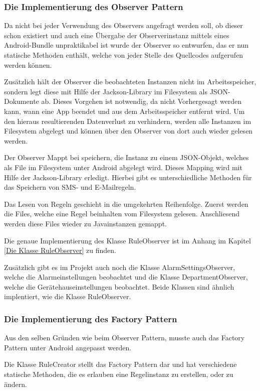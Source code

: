 \subsubsection{Die Implementierung des Observer Pattern}
Da nicht bei jeder Verwendung des Observers angefragt werden soll, ob dieser schon existiert und auch eine \"Ubergabe der Observerinstanz mittels eines Android-Bundle unpraktikabel ist wurde der Observer so entwurfen, das er nun statische Methoden enth\"alt, welche von jeder Stelle des Quellcodes aufgerufen werden k\"onnen.

Zus\"atzlich h\"alt der Observer die beobachteten Instanzen nicht im Arbeitsspeicher, sondern legt diese mit Hilfe der Jackson-Library im Filesystem als JSON-Dokumente ab.
Dieses Vorgehen ist notwendig, da nicht Vorhergesagt werden kann, wann eine App beendet und aus dem Arbeitsspeicher entfernt wird. Um den hieraus resultierenden Datenverlust zu verhindern, werden alle Instanzen im Filesystem abgelegt und k\"onnen \"uber den Observer von dort auch wieder gelesen werden.

Der Observer Mappt bei speichern, die Instanz zu einem JSON-Objekt, welches als File im Filesystem unter Android abgelegt wird. Dieses Mapping wird mit Hilfe der Jackson-Library erledigt. Hierbei gibt es unterschiedliche Methoden f\"ur das Speichern von SMS- und E-Mailregeln.

Das Lesen von Regeln geschieht in die umgekehrten Reihenfolge. Zuerst werden die Files, welche eine Regel beinhalten vom Filesystem gelesen. Anschliesend werden diese Files wieder zu Javainstanzen gemappt.

Die genaue Implementierung des Klasse RuleObserver ist im Anhang im Kapitel \ref{Die Klasse RuleObserver} zu finden.

Zus\"atzlich gibt es im Projekt auch noch die Klasse AlarmSettingsObserver, welche die Alarmeinstellungen beobachtet und die Klasse DepartmentObserver, welche die Ger\"atehauseinstellungen beobachtet. Beide Klassen sind \"ahnlich implentiert, wie die Klasse RuleObserver.

\subsubsection{Die Implementierung des Factory Pattern}
Aus den selben Gr\"unden wie beim Observer Pattern, musste auch das Factory Pattern unter Android angepasst werden.

Die Klasse RuleCreator stellt das Factory Pattern dar und hat verschiedene statische Methoden, die es erlauben eine Regelinstanz zu erstellen, oder zu \"andern.


